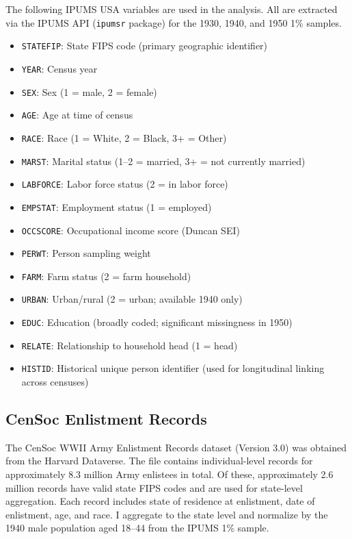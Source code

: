 \documentclass[12pt]{article}
\begin{document}
The following IPUMS USA variables are used in the analysis. All are extracted via the IPUMS API (\texttt{ipumsr} package) for the 1930, 1940, and 1950 1\% samples.

\begin{itemize}
\item \texttt{STATEFIP}: State FIPS code (primary geographic identifier)
\item \texttt{YEAR}: Census year
\item \texttt{SEX}: Sex (1 = male, 2 = female)
\item \texttt{AGE}: Age at time of census
\item \texttt{RACE}: Race (1 = White, 2 = Black, 3+ = Other)
\item \texttt{MARST}: Marital status (1--2 = married, 3+ = not currently married)
\item \texttt{LABFORCE}: Labor force status (2 = in labor force)
\item \texttt{EMPSTAT}: Employment status (1 = employed)
\item \texttt{OCCSCORE}: Occupational income score (Duncan SEI)
\item \texttt{PERWT}: Person sampling weight
\item \texttt{FARM}: Farm status (2 = farm household)
\item \texttt{URBAN}: Urban/rural (2 = urban; available 1940 only)
\item \texttt{EDUC}: Education (broadly coded; significant missingness in 1950)
\item \texttt{RELATE}: Relationship to household head (1 = head)
\item \texttt{HISTID}: Historical unique person identifier (used for longitudinal linking across censuses)
\end{itemize}

\subsection{CenSoc Enlistment Records}

The CenSoc WWII Army Enlistment Records dataset (Version 3.0) was obtained from the Harvard Dataverse. The file contains individual-level records for approximately 8.3 million Army enlistees in total. Of these, approximately 2.6 million records have valid state FIPS codes and are used for state-level aggregation. Each record includes state of residence at enlistment, date of enlistment, age, and race. I aggregate to the state level and normalize by the 1940 male population aged 18--44 from the IPUMS 1\% sample.
\end{document}
